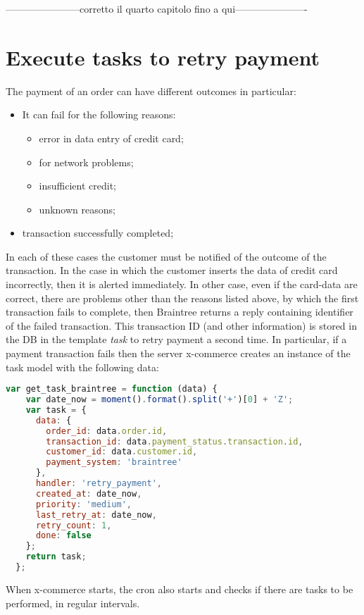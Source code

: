 {\color{red} -----------------------corretto il quarto capitolo fino a qui----------------------}
\section{Execute tasks to retry payment}
\label{sec:tasks_to_retry_payment}
The payment of an order can have different outcomes in particular:
\begin{itemize}
\item It can fail for the following reasons:
\begin{itemize}
\item error in data entry of credit card;
\item for network problems;
\item insufficient credit;
\item unknown reasons;
\end{itemize}
\item transaction successfully completed;
\end{itemize}
In each of these cases the customer must be notified of the outcome of the transaction.
\newline
In the case in which the customer inserts the data of credit card incorrectly, then it is alerted immediately.
\newline
In other case, even if the card-data are correct, there are problems other than the reasons listed above, by which the first transaction fails to complete, then Braintree returns a reply containing identifier of the failed transaction.
\newline
This transaction ID (and other information) is stored in the DB in the template \emph{task} to retry payment a second time.
In particular, if a payment transaction fails then the server x-commerce creates an instance of the task model with the following data:
\begin{lstlisting}[language=javascript]
  var get_task_braintree = function (data) {
    var date_now = moment().format().split('+')[0] + 'Z';
    var task = {
      data: {
        order_id: data.order.id,
        transaction_id: data.payment_status.transaction.id,
        customer_id: data.customer.id,
        payment_system: 'braintree'
      },
      handler: 'retry_payment',
      created_at: date_now,
      priority: 'medium',
      last_retry_at: date_now,
      retry_count: 1,
      done: false
    };
    return task;
  };
\end{lstlisting}
When x-commerce starts, the cron also starts and checks if there are tasks to be performed, in regular intervals.

